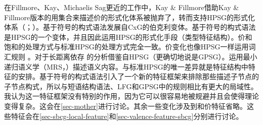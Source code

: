 \addlines
在Fillmore、Kay、Michaelis \biband Sag更近的工作中，Kay \& Fillmore借助Kay \& Fillmore版本的用集合来描述价的形式化体系被抛弃了，转而支持HPSG的形式化体系（\citealp{Kay2005a,Michaelis2006a,Sag2012a}；\citealp*[--11]{SBK2012a}）。基于符号的构式语法发展自CxG的伯克利变体。基于符号的构式语法是HPSG的一个变体\citep[]{Sag2010b}，并且因此运用HPSG的形式化手段（类型特征结构）。价和饱和的处理方式与标准HPSG的处理方式完全一致。价变化也像HPSG一样运用词汇规则 \citep*[\S~2.3]{SBK2012a}。对于长距离依存  的分析借鉴自HPSG（更确切地说是GPSG\indexgpsgc）。运用最小递归语义学（MRS\indexmrsc，\citealp*{CFPS2005a}）描述语义内容。与标准HPSG的唯一差异就是特征结构中特征的安排。基于符号的构式语法引入了一个新的特征框架来排除那些描述子节点的子节点构式，所以与短语结构语法、LFG和GPSG中的规则相比有更大的局域性。我认为这一特征框架没有特别的作用，因为它可以很容易地被规避并且会使得理论变得复杂。这会在\ref{sec-mother}进行讨论。其余一些变化涉及到\localfc 和价特征省略。这些特征会在\ref{sec-sbcg-local-feature}和\ref{sec-valence-feature-sbcg}分别进行讨论。

